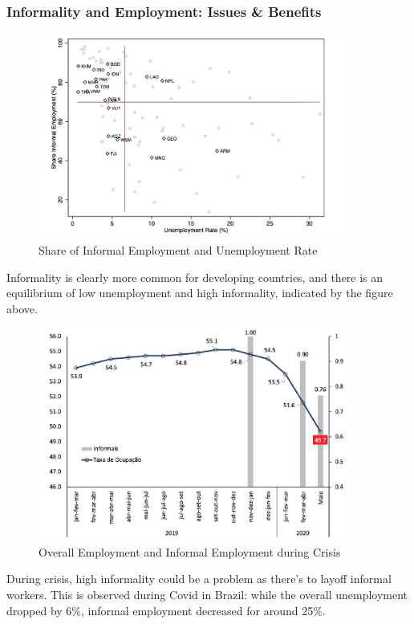         \subsubsection{Informality and Employment: Issues \& Benefits}
            \begin{figure}[H]
                \centering
                \includegraphics[width=4in]{images/ch6/informal r unemployment r.png}
                \caption{Share of Informal Employment and Unemployment Rate}
            \end{figure}
            Informality is clearly more common for developing countries, and there is an equilibrium of low unemployment and high informality, indicated by the figure above.
            \begin{figure}[H]
                \centering
                \includegraphics[width=4in]{images/ch6/informal emp during crisis.png}
                \caption{Overall Employment and Informal Employment during Crisis}
            \end{figure}
            During crisis, high informality could be a problem as there's  to layoff informal workers. This is observed during Covid in Brazil: while the overall unemployment dropped by 6\%, informal employment decreased for around 25\%.
